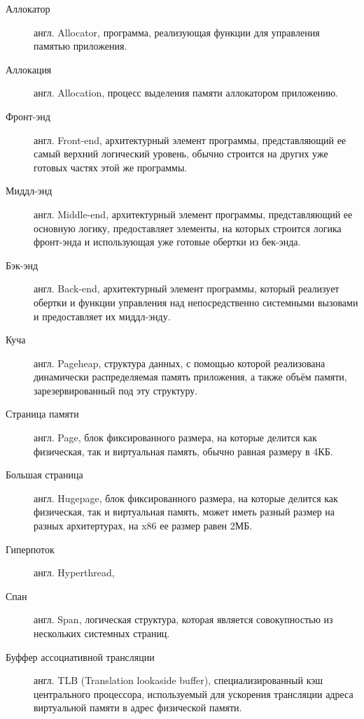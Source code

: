 \Defines %
\begin{description}
	\item[Аллокатор] англ. Allocator, программа, реализующая функции для управления памятью приложения.
	\item[Аллокация] англ. Allocation, процесс выделения памяти аллокатором приложению.
	\item[Фронт-энд] англ. Front-end, архитектурный элемент программы, представляющий ее самый верхний логический уровень, обычно строится на других уже готовых частях этой же программы.
	\item[Миддл-энд] англ. Middle-end, архитектурный элемент программы, представляющий ее основную логику, предоставляет элементы, на которых строится логика фронт-энда и использующая уже готовые обертки из бек-энда.
	\item[Бэк-энд] англ. Back-end, архитектурный элемент программы, который реализует обертки и функции управления над непосредственно системными вызовами и предоставляет их миддл-энду.
	\item[Куча] англ. Pageheap, структура данных, с помощью которой реализована динамически распределяемая память приложения, а также объём памяти, зарезервированный под эту структуру.
	\item[Страница памяти] англ. Page, блок фиксированного размера, на которые делится как физическая, так и виртуальная память, обычно равная размеру в 4КБ.
	\item[Большая страница] англ. Hugepage, блок фиксированного размера, на которые делится как физическая, так и виртуальная память, может иметь разный размер на разных архитертурах, на x86 ее размер равен 2МБ.
	\item[Гиперпоток] англ. Hyperthread, 
	\item[Спан] англ. Span, логическая структура, которая является совокупностью из нескольких системных страниц.
	\item[Буффер ассоциативной трансляции] англ. TLB (Translation lookaside buffer), специализированный кэш центрального процессора, используемый для ускорения трансляции адреса виртуальной памяти в адрес физической памяти.
\end{description}

